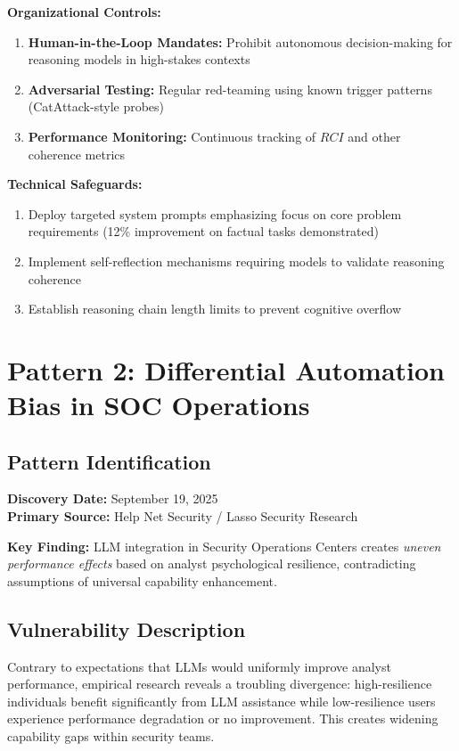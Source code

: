 \documentclass[11pt,a4paper]{article}
\begin{document}
\textbf{Organizational Controls:}
\begin{enumerate}
\item \textbf{Human-in-the-Loop Mandates:} Prohibit autonomous decision-making for reasoning models in high-stakes contexts
\item \textbf{Adversarial Testing:} Regular red-teaming using known trigger patterns (CatAttack-style probes)
\item \textbf{Performance Monitoring:} Continuous tracking of $RCI$ and other coherence metrics
\end{enumerate}

\textbf{Technical Safeguards:}
\begin{enumerate}
\item Deploy targeted system prompts emphasizing focus on core problem requirements (12\% improvement on factual tasks demonstrated)
\item Implement self-reflection mechanisms requiring models to validate reasoning coherence
\item Establish reasoning chain length limits to prevent cognitive overflow
\end{enumerate}

\section{Pattern 2: Differential Automation Bias in SOC Operations}

\subsection{Pattern Identification}

\textbf{Discovery Date:} September 19, 2025\\
\textbf{Primary Source:} Help Net Security / Lasso Security Research\cite{helpnet2025llm}

\textbf{Key Finding:} LLM integration in Security Operations Centers creates \textit{uneven performance effects} based on analyst psychological resilience, contradicting assumptions of universal capability enhancement.

\subsection{Vulnerability Description}

Contrary to expectations that LLMs would uniformly improve analyst performance, empirical research reveals a troubling divergence: high-resilience individuals benefit significantly from LLM assistance while low-resilience users experience performance degradation or no improvement. This creates widening capability gaps within security teams.
\end{document}
